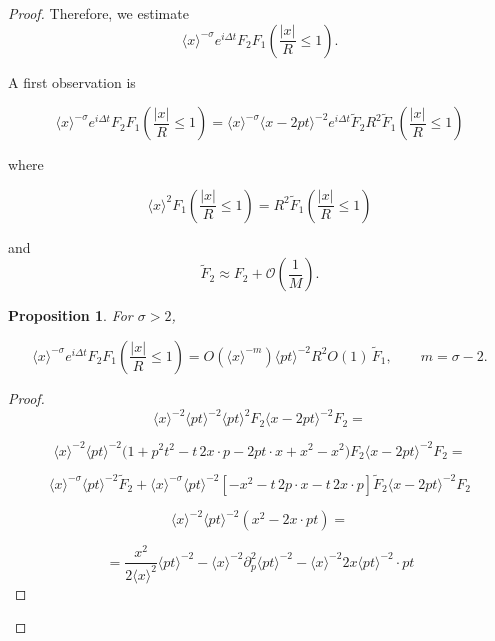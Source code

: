 \documentclass[11pt]{article}
\newtheorem{proposition}[theorem]{Proposition}
\begin{document}
\begin{proof}
Therefore, we estimate
\[\langle x\rangle^{-\sigma}e^{i\Delta t}F_2F_1\!\left(\frac{|x|}{R}\leq 1\right).\]

A first observation is

\begin{equation}
\langle x\rangle^{-\sigma}e^{i\Delta t}F_2
F_1\!\left(\frac{|x|}{R}\leq 1\right)=\langle x\rangle^{-\sigma}\langle x-2pt\rangle^{-2}e^{i\Delta t}\widetilde F_2R^{2}\widetilde F_1\!\left(\frac{|x|}{R}\leq 1\right)
\end{equation}

where

\begin{equation}
\langle x\rangle^2F_1\!\left(\frac{|x|}{R}\leq 1\right)=R^2\widetilde F_1\!\left(\frac{|x|}{R}\leq 1\right)
\end{equation}

and
\[\widetilde F_2 \approx F_2 +\mathcal{O}( \frac{1}{M}).\]

\begin{proposition}

For $\sigma>2$,

\begin{equation}
\langle x\rangle^{-\sigma}e^{i\Delta t}F_2F_1\!\left(\frac{|x|}{R}\leq 1\right)=O(\langle x\rangle^{-m})\langle pt\rangle^{-2}R^2O(1)\,\widetilde F_1,\qquad
m=\sigma-2.
\end{equation}
\end{proposition}
\begin{proof}
\begin{equation}
\langle x\rangle^{-2}\langle pt\rangle^{-2}\langle pt\rangle^{2}F_2\langle x-2pt\rangle^{-2}F_2=
\end{equation}

\[
\langle x\rangle^{-2}\langle pt\rangle^{-2}\Big(1+p^2t^2-t\,2x\!\cdot\! p-2pt\!\cdot\! x+x^2-x^2\Big)F_2\langle x-2pt\rangle^{-2}F_2=
\]

\[
\langle x\rangle^{-\sigma}\langle pt\rangle^{-2}\widetilde F_2+\langle x\rangle^{-\sigma}\langle pt\rangle^{-2}[-x^2-t\,2p\!\cdot\!x-t\,2x\!\cdot\!p]\widetilde F_2\langle x-2pt\rangle^{-2}F_2
\]

\begin{equation}
\langle x\rangle^{-2}\langle pt\rangle^{-2}(x^2-2x\!\cdot\!pt)=
\end{equation}

\[
=\frac{x^2}{2\langle x\rangle^2}\langle pt\rangle^{-2}-\langle x\rangle^{-2}\partial_p^2\langle pt\rangle^{-2}-\langle x\rangle^{-2}2x\langle pt\rangle^{-2}\cdot pt
\]


\end{proof}
\end{proof}
\end{document}
